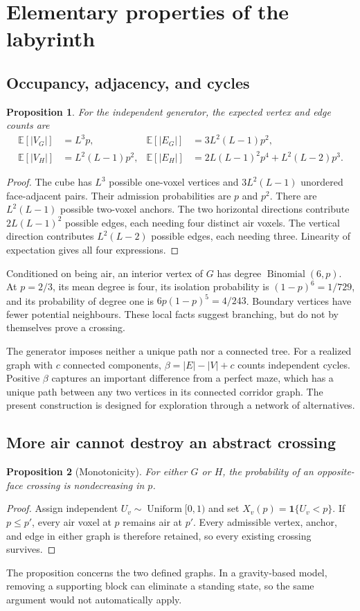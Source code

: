 \documentclass[11pt,letterpaper]{article}
\newtheorem{proposition}{Proposition}
\newcommand{\E}{\mathbb{E}}
\newcommand{\ind}{\mathbf{1}}
\begin{document}
\section{Elementary properties of the labyrinth}
\subsection{Occupancy, adjacency, and cycles}
\begin{proposition}
\label{prop:moments}
For the independent generator, the expected vertex and edge counts are
\begin{align}
 \E[|V_G|]&=L^3p,&
 \E[|E_G|]&=3L^2(L-1)p^2,\\
 \E[|V_H|]&=L^2(L-1)p^2,&
 \E[|E_H|]&=2L(L-1)^2p^4+L^2(L-2)p^3.
 \label{eq:moments}
\end{align}
\end{proposition}
\begin{proof}
The cube has $L^3$ possible one-voxel vertices and $3L^2(L-1)$ unordered
face-adjacent pairs. Their admission probabilities are $p$ and $p^2$.
There are $L^2(L-1)$ possible two-voxel anchors. The two horizontal directions
contribute $2L(L-1)^2$ possible edges, each needing four distinct air voxels.
The vertical direction contributes $L^2(L-2)$ possible edges, each needing three.
Linearity of expectation gives all four expressions.
\end{proof}

Conditioned on being air, an interior vertex of $G$ has degree
$\operatorname{Binomial}(6,p)$. At $p=2/3$, its mean degree is four, its
isolation probability is $(1-p)^6=1/729$, and its probability of degree one
is $6p(1-p)^5=4/243$. Boundary vertices have fewer potential neighbours.
These local facts suggest branching, but do not by themselves prove a crossing.

The generator imposes neither a unique path nor a connected tree.
For a realized graph with $c$ connected components,
$\beta=|E|-|V|+c$ counts independent cycles. Positive $\beta$ captures an
important difference from a perfect maze, which has a unique path between any
two vertices in its connected corridor graph. The present construction is
designed for exploration through a network of alternatives.

\subsection{More air cannot destroy an abstract crossing}
\begin{proposition}[Monotonicity]
For either $G$ or $H$, the probability of an opposite-face crossing is
nondecreasing in $p$.
\end{proposition}
\begin{proof}
Assign independent $U_v\sim\operatorname{Uniform}[0,1)$ and set
$X_v(p)=\ind\{U_v<p\}$. If $p\leq p'$, every air voxel at $p$ remains air at
$p'$. Every admissible vertex, anchor, and edge in either graph is therefore
retained, so every existing crossing survives.
\end{proof}
The proposition concerns the two defined graphs. In a gravity-based model,
removing a supporting block can eliminate a standing state, so the same argument
would not automatically apply.
\end{document}
